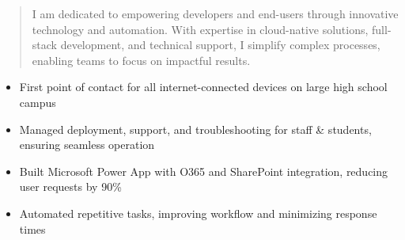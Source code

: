 



\makecvheader

\begin{quote}
  \noindent
  I am dedicated to empowering developers and end-users through innovative technology and automation. With expertise in cloud-native solutions, full-stack development, and technical support, I simplify complex processes, enabling teams to focus on impactful results.
\end{quote}

\par\smallskip
\noindent
\begin{minipage}{20cm}
  \begin{minipage}{9.75cm}
    \begin{itemize}
      \item First point of contact for all internet-connected devices on large high school campus
      \item Managed deployment, support, and troubleshooting for staff \& students, ensuring seamless operation
    \end{itemize}
  \end{minipage}
  \hfill
  \begin{minipage}{9.75cm}
    \begin{itemize}
      \item Built Microsoft Power App with O365 and SharePoint integration, reducing user requests by 90\%
      \item Automated repetitive tasks, improving workflow and minimizing response times
    \end{itemize}
  \end{minipage}
\end{minipage}
\par\smallskip
\divider

